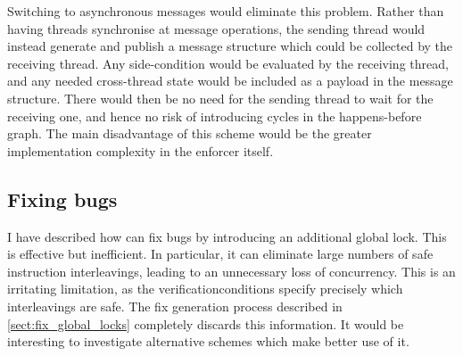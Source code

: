 Switching to asynchronous messages would eliminate this problem.
Rather than having threads synchronise at message operations, the
sending thread would instead generate and publish a message structure
which could be collected by the receiving thread.  Any side-condition
would be evaluated by the receiving thread, and any needed
cross-thread state would be included as a payload in the message
structure.  There would then be no need for the sending thread to wait
for the receiving one, and hence no risk of introducing cycles in the
happens-before graph.  The main disadvantage of this scheme would be
the greater implementation complexity in the enforcer itself.

\subsection{Fixing bugs}

I have described how {\technique} can fix bugs by introducing an
additional global lock.  This is effective but inefficient.  In
particular, it can eliminate large numbers of safe instruction
interleavings, leading to an unnecessary loss of concurrency.  This is
an irritating limitation, as the \glspl{verificationcondition} specify
precisely which interleavings are safe.  The fix generation process
described in \autoref{sect:fix_global_locks} completely discards this
information.  It would be interesting to investigate alternative
schemes which make better use of it.
  
